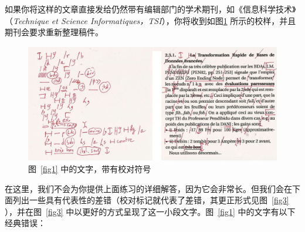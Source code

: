如果你将这样的文章直接发给仍然带有编辑部门的学术期刊，如《信息科学技术》（\emph{Technique et Science Informatiques，TSI}），你将收到如图\ref{fig2} 所示的校样，并且期刊会要求重新整理稿件。

\begin{figure}
    \centering
    \includegraphics[width = .75\linewidth]{img/2.png}
    \caption{图~\ref{fig1} 中的文字，带有校对符号}
    \label{fig2}
\end{figure}

在这里，我们不会为你提供上面练习的详细解答，因为它会非常长。但我们会在下面列出一些具有代表性的差错（校对标记就代表了差错，其更正形式见图~\ref{fig3} ），并在图~\ref{fig3} 中以更好的方式呈现了这一小段文字。图~\ref{fig1} 中的文字有以下经典错误：

